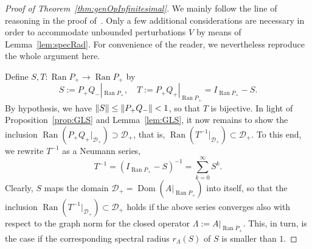 \documentclass[11pt,a4paper]{amsart}
\numberwithin{equation}{section}
\DeclareMathOperator{\Ran}{Ran}
\DeclareMathOperator{\Dom}{Dom}
\DeclarePairedDelimiter{\norm}{\lVert}{\rVert}
\newcommand{\cD}{{\mathcal D}}
\theoremstyle{plain}
\theoremstyle{definition}
\theoremstyle{remark}
\begin{document}
\begin{proof}[Proof of Theorem~\ref{thm:genOpInfinitesimal}]
  We mainly follow the line of reasoning in the proof of~\cite[Lemma~A.6]{NSTTV18}. Only a few additional considerations are
  necessary in order to accommodate unbounded perturbations $V$ by means of Lemma~\ref{lem:specRad}. For convenience of the
  reader, we nevertheless reproduce the whole argument here.
 
  Define $S,T \colon \Ran P_+ \to \Ran P_+$ by
  \begin{equation*}
    S := P_+Q_-|_{\Ran P_+},\quad T := P_+Q_+|_{\Ran P_+} = I_{\Ran P_+} - S.
  \end{equation*}
  By hypothesis, we have $\norm{S} \le \norm{P_+Q_-} < 1$, so that $T$ is bijective. In light of Proposition~\ref{prop:GLS} and
  Lemma~\ref{lem:GLS}, it now remains to show the inclusion $\Ran(P_+Q_+|_{\cD_+}) \supset \cD_+$, that is,
  $\Ran(T^{-1}|_{\cD_+})\subset\cD_+$. To this end, we rewrite $T^{-1}$ as a Neumann series,
  \begin{equation*}
    T^{-1}
    =
    (I_{\Ran P_+} - S)^{-1}
    =
    \sum_{k=0}^\infty S^k
    .
  \end{equation*}
  Clearly, $S$ maps the domain $\cD_+=\Dom(A|_{\Ran P_+})$ into itself, so that the inclusion $\Ran(T^{-1}|_{\cD_+})\subset\cD_+$
  holds if the above series converges also with respect to the graph norm for the closed operator $\Lambda:=A|_{\Ran P_+}$. This,
  in turn, is the case if the corresponding spectral radius $r_\Lambda(S)$ of $S$ is smaller than $1$.


\end{proof}
\end{document}
